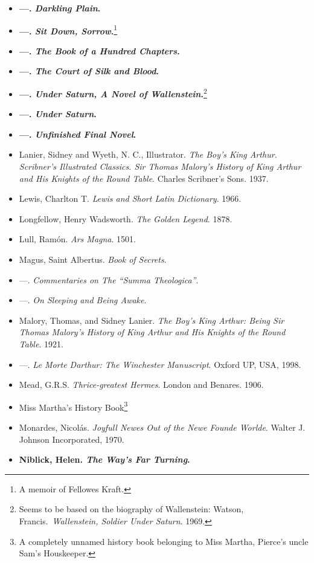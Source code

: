 \documentclass[12pt]{article}
\begin{document}
\begin{itemize}
  \textbf{---. \emph{Bruno's Journey}. 1931}
\item
  \textbf{---. \emph{Darkling Plain}.}
\item
  \textbf{---. \emph{Sit Down, Sorrow}.}\footnote{A memoir of Fellowes Kraft.}
\item
  \textbf{---. \emph{The Book of a Hundred Chapters}.}
\item
  \textbf{---. \emph{The Court of Silk and Blood}.}
\item
  \textbf{---. \emph{Under Saturn, A Novel of Wallenstein}.}\footnote{Seems to be based on the biography of Wallenstein: Watson, Francis.~\emph{Wallenstein, Soldier Under Saturn}. 1969.}
\item
  \textbf{---. \emph{Under Saturn}.}
\item
  \textbf{---. \emph{Unfinished Final Novel}.}
\item
  Lanier, Sidney and Wyeth, N. C., Illustrator. \emph{The Boy's King Arthur. Scribner's Illustrated Classics. Sir Thomas Malory's History of King Arthur and His Knights of the Round Table}. Charles Scribner's Sons. 1937.
\item
  Lewis, Charlton T. \emph{Lewis and Short Latin Dictionary}. 1966.
\item
  Longfellow, Henry Wadsworth. \emph{The Golden Legend}. 1878.
\item
  Lull, Ramón. \emph{Ars Magna}. 1501.
\item
  Magus, Saint Albertus. \emph{Book of Secrets}.
\item
  \! ---. \emph{Commentaries on The ``Summa Theologica''}.
\item
  \! ---. \emph{On Sleeping and Being Awake}.
\item
  Malory, Thomas, and Sidney Lanier. \emph{The Boy's King Arthur: Being Sir Thomas Malory's History of King Arthur and His Knights of the Round Table}. 1921.
\item
  \! ---. \emph{Le Morte Darthur: The Winchester Manuscript}. Oxford UP, USA, 1998.
\item
  Mead, G.R.S. \emph{Thrice-greatest Hermes}. London and Benares. 1906.
\item
  Miss Martha's History Book\footnote{A completely unnamed history book belonging to Miss Martha, Pierce's uncle Sam's Houskeeper.}
\item
  Monardes, Nicolás. \emph{Joyfull Newes Out of the Newe Founde Worlde}. Walter J. Johnson Incorporated, 1970.
\item
  \textbf{Niblick, Helen. \emph{The Way's Far Turning}.}

\end{itemize}
\end{document}
